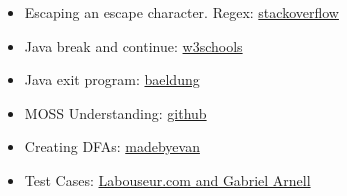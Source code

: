 \documentclass[letterpaper, 10pt,DIV=13]{scrartcl}
\numberwithin{equation}{section} %
\numberwithin{figure}{section} %
\numberwithin{table}{section} %
\begin{document}
\begin{itemize}
    \item Escaping an escape character. Regex: \href{https://stackoverflow.com/questions/9113328/java-regular-expression-need-to-escape-backslash-in-regex#:~:text=In%20short%2C%20you%20always%20need,as%20the%20escaped%20backslash%20character.}{stackoverflow}
    \item Java break and continue: \href{https://www.w3schools.com/java/java_break.asp}{w3schools}
    \item Java exit program: \href{https://www.baeldung.com/java-stop-running-code#:~:text=a%20flag%20variable.-,System.,an%20exit%20status%20of%200.&text=We%20terminate%20the%20program%20using%20System.}{baeldung}
    \item MOSS Understanding: \href{https://yangdanny97.github.io/blog/2019/05/03/MOSS}{github}
    \item Creating DFAs: \href{https://madebyevan.com/fsm/}{madebyevan}
    \item Test Cases: \href{https://www.labouseur.com/courses/compilers/compilers/arnell/dist/index.html}{Labouseur.com and Gabriel Arnell}
    
\end{itemize}

\pagebreak

% 
\end{document}
